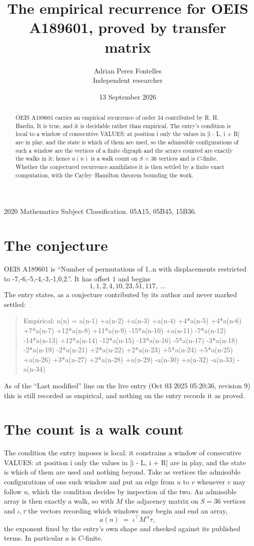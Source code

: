 \documentclass[11pt,a4paper]{article}
\title{The empirical recurrence for OEIS A189601, proved by transfer matrix}
\author{Adrian Perez Fontelles\\ \small Independent researcher}
\date{13 September 2026}
\theoremstyle{plain}
\theoremstyle{definition}
\begin{document}
\maketitle

\begin{abstract}
OEIS A189601 carries an empirical recurrence of order $34$ contributed by R. H. Hardin. It is
true, and it is decidable rather than empirical. The entry's condition is local to a window of consecutive VALUES: at position i only the values in [i - L, i + R] are in play, and the state is which of them are used, so
the admissible configurations of such a window are the vertices of a finite digraph and the
arrays counted are exactly the walks in it; hence $a(n)$ is a walk count on $S=36$ vertices
and is $C$-finite. Whether the conjectured recurrence annihilates it is then settled by a
finite exact computation, with the Cayley--Hamilton theorem bounding the work.
\end{abstract}

\noindent\small 2020 Mathematics Subject Classification. 05A15, 05B45, 15B36.\normalsize

\section{The conjecture}

OEIS A189601 is ``Number of permutations of 1..n with displacements restricted to {-7,-6,-5,-4,-3,-1,0,2}.''. It has offset $1$ and begins
\[
1, 1, 2, 4, 10, 23, 51, 117,\ \dots
\]
The entry states, as a conjecture contributed by its author and never marked settled:
\begin{quote}
Empirical: a(n) = a(n-1) +a(n-2) +a(n-3) +a(n-4) +4*a(n-5) +4*a(n-6) +7*a(n-7) +12*a(n-8) +11*a(n-9) -15*a(n-10) +a(n-11) -7*a(n-12) -14*a(n-13) +12*a(n-14) -12*a(n-15) -13*a(n-16) -5*a(n-17) -3*a(n-18) -2*a(n-19) -2*a(n-21) +2*a(n-22) +2*a(n-23) +5*a(n-24) +5*a(n-25) +a(n-26) +3*a(n-27) +2*a(n-28) +a(n-29) -a(n-30) +a(n-32) -a(n-33) -a(n-34)
\end{quote}
As of the ``Last modified'' line on the live entry (Oct 03 2025 05:20:36, revision 9) this is still
recorded as empirical, and nothing on the entry records it as proved.

\section{The count is a walk count}

The condition the entry imposes is local: it constrains a window of consecutive VALUES: at position i only the values in [i - L, i + R] are in play, and the state is which of them are used and nothing beyond. Take as
vertices the admissible configurations of one such window and put an edge from $u$ to $v$
whenever $v$ may follow $u$, which the condition decides by inspection of the two. An
admissible array is then exactly a walk, so with $M$ the adjacency matrix on $S=36$ vertices
and $\iota,\tau$ the vectors recording which windows may begin and end an array,
\[
a(n)\;=\;\iota^{\!\top}M^{\,n}\tau ,
\]
the exponent fixed by the entry's own shape and checked against its published terms. In
particular $a$ is $C$-finite.
\end{document}
